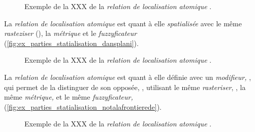 \begin{figure}
  \centering
  
  \caption{Exemple de la XXX de la \emph{relation de localisation
      atomique} \protect{}.}
  \label{fig:ex_parties_statialisation_sousalt}
\end{figure}

La \emph{relation de localisation atomique}  est quant à elle \emph{spatialisée} avec le même \emph{rasteziser} (), la \emph{métrique}  et le \emph{fuzzyficateur}  (\autoref{fig:ex_parties_statialisation_dansplani}).

\begin{figure}
  \centering
  
  \caption{Exemple de la XXX de la \emph{relation de localisation
      atomique} \protect{}.}
  \label{fig:ex_parties_statialisation_dansplani}
\end{figure}

La \emph{relation de localisation atomique}  est quant à elle définie avec un \emph{modifieur,} , qui permet de la distinguer de son opposée, , utilisant le même \emph{rasteriser}, , la même \emph{métrique,}  et le même \emph{fuzzyficateur,}  (\autoref{fig:ex_parties_statialisation_notalafrontierede}).

\begin{figure}
  \centering
  
  \caption{Exemple de la XXX de la \emph{relation de localisation
      atomique} \protect{}.}
  \label{fig:ex_parties_statialisation_notalafrontierede}
\end{figure}

